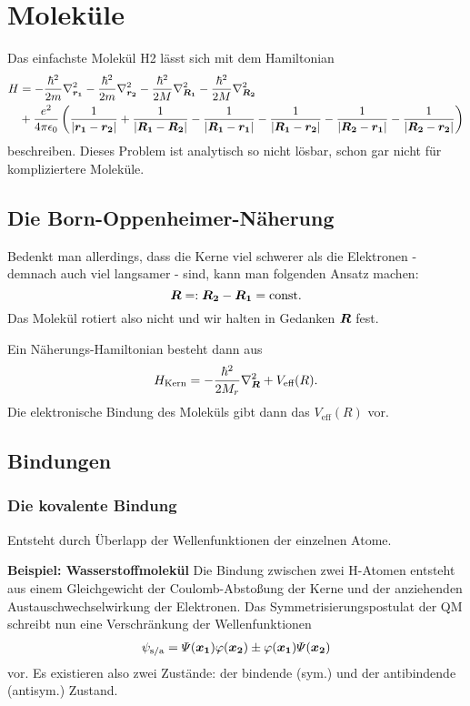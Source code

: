 \chapter{Moleküle}
Das einfachste Molekül H2 lässt sich mit dem Hamiltonian
\begin{align*}
	H &= -\frac{\hbar^2}{2m}\laplacian_{\mvec{r_1}} -\frac{\hbar^2}{2m}\laplacian_{\mvec{r_2}} -\frac{\hbar^2}{2M}\laplacian_{\mvec{R_1}} -\frac{\hbar^2}{2M}\laplacian_{\mvec{R_2}} \\
	&+ \frac{e^2}{4\pi\epsilon_0} \left(\frac{1}{|\mvec{r_1}-\mvec{r_2}|} + \frac{1}{|\mvec{R_1}-\mvec{R_2}|} -\frac{1}{|\mvec{R_1}-\mvec{r_1}|} - \frac{1}{|\mvec{R_1}-\mvec{r_2}|} - \frac{1}{|\mvec{R_2}-\mvec{r_1}|} - \frac{1}{|\mvec{R_2}-\mvec{r_2}|} \right)
\end{align*}
beschreiben.
Dieses Problem ist analytisch so nicht lösbar, schon gar nicht für kompliziertere Moleküle.

\section{Die Born-Oppenheimer-Näherung}
Bedenkt man allerdings, dass die Kerne viel schwerer als die Elektronen - demnach auch viel langsamer - sind, kann man folgenden Ansatz machen:
\begin{equation*}
	\boldsymbol{R} =: \boldsymbol{R_2}-\boldsymbol{R_1} = \text{const}.
\end{equation*}
Das Molekül rotiert also nicht und wir halten in Gedanken $\boldsymbol{R}$ fest.

Ein Näherungs-Hamiltonian besteht dann aus
\begin{equation*}
	H_\text{Kern} = -\frac{\hbar^2}{2M_r}\laplacian_{\mvec{R}} + V_\text{eff}(R).
\end{equation*}
Die elektronische Bindung des Moleküls gibt dann das $V_\text{eff}(R)$ vor.

\section{Bindungen}

\subsection{Die kovalente Bindung}
Entsteht durch Überlapp der Wellenfunktionen der einzelnen Atome.

\textbf{Beispiel: Wasserstoffmolekül}  Die Bindung zwischen zwei H-Atomen entsteht aus einem Gleichgewicht der Coulomb-Abstoßung der Kerne und der anziehenden Austauschwechselwirkung der Elektronen.
Das Symmetrisierungspostulat der QM schreibt nun eine Verschränkung der Wellenfunktionen
\begin{align*}
	\psi_\text{s/a} = \varPsi(\boldsymbol{x_1})\varphi(\boldsymbol{x_2}) \pm \varphi(\boldsymbol{x_1})\varPsi(\boldsymbol{x_2})
\end{align*}
vor.
Es existieren also zwei Zustände: der bindende (sym.) und der antibindende (antisym.) Zustand.

